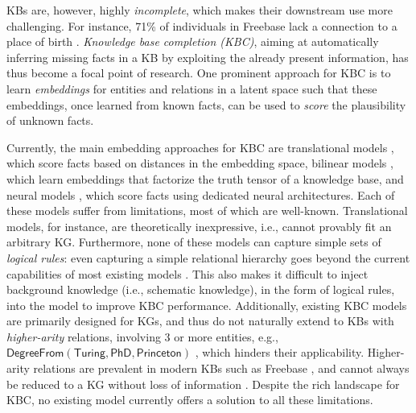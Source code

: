 \documentclass{article}
\begin{document}
KBs are, however, highly \emph{incomplete}, which makes their downstream use more challenging. For instance, 71\% of individuals in Freebase lack a connection to a place of birth \cite{WestGMSGL14}.
\emph{Knowledge base completion (KBC)}, aiming at automatically inferring missing facts in a KB by exploiting the already present information, has thus become a focal point of research.
One prominent approach for KBC is to learn \emph{embeddings} for entities and relations in a latent space such that these embeddings, once learned from known facts, can be used to \emph{score} the plausibility of unknown facts. 

Currently, the main embedding approaches for KBC are translational models \cite{TransE-NIPS13, RotatE-ICLR19}, which score facts based on distances in the embedding space, bilinear models \cite{ComplEx-ICML16, DistMult-ICLR15, TuckER},  which learn embeddings that factorize the truth tensor of a knowledge base, and neural models \cite{ConvE-AAAI18, SocherCMN13, KBGAT-ACL19},  which score facts using dedicated neural architectures. 
Each of these models suffer from limitations, most of which are well-known. 
Translational models, for instance, are theoretically inexpressive, i.e., cannot provably fit an arbitrary KG. 
Furthermore, none of these models can capture simple sets of \emph{logical rules}: even capturing a simple relational hierarchy goes beyond the current capabilities of most existing models \cite{Gutirrez18}.
This also makes it difficult to inject background knowledge (i.e., schematic knowledge), in the form of logical rules, into the model to  improve KBC performance.
Additionally, existing KBC models are primarily designed for KGs, and thus do not naturally extend to KBs with \emph{higher-arity} relations, involving 3 or more entities, e.g.,  $\mathsf{DegreeFrom(Turing,PhD,Princeton)}$ \cite{Fatemi19}, which hinders their applicability. Higher-arity relations are prevalent in modern KBs such as Freebase \cite{Wen16}, and cannot always be reduced to a KG without loss of information \cite{Fatemi19}. 
Despite the rich landscape for KBC, no existing model currently offers a solution to all these limitations.
\end{document}
